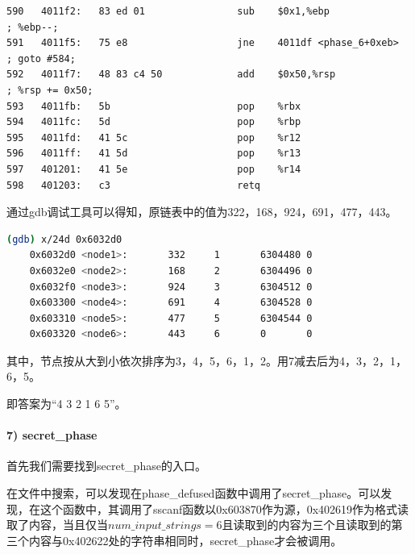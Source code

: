 \documentclass{article}
\begin{document}
\begin{lstlisting}[title = phase\_6对应的反汇编代码及注释, xleftmargin = 2em,xrightmargin = 2em, aboveskip = 1em, numbers = none, basicstyle=\footnotesize\ttfamily]
590   4011f2:   83 ed 01                sub    $0x1,%ebp                    ; %ebp--;
591   4011f5:   75 e8                   jne    4011df <phase_6+0xeb>        ; goto #584;
592   4011f7:   48 83 c4 50             add    $0x50,%rsp                   ; %rsp += 0x50;
593   4011fb:   5b                      pop    %rbx
594   4011fc:   5d                      pop    %rbp
595   4011fd:   41 5c                   pop    %r12
596   4011ff:   41 5d                   pop    %r13
597   401201:   41 5e                   pop    %r14
598   401203:   c3                      retq
  \end{lstlisting}

通过gdb调试工具可以得知，原链表中的值为322，168，924，691，477，443。
\begin{lstlisting}[language=bash]
    (gdb) x/24d 0x6032d0
    0x6032d0 <node1>:       332     1       6304480 0
    0x6032e0 <node2>:       168     2       6304496 0
    0x6032f0 <node3>:       924     3       6304512 0
    0x603300 <node4>:       691     4       6304528 0
    0x603310 <node5>:       477     5       6304544 0
    0x603320 <node6>:       443     6       0       0
  \end{lstlisting}

其中，节点按从大到小依次排序为3，4，5，6，1，2。用7减去后为4，3，2，1，6，5。

即答案为“4 3 2 1 6 5”。

\paragraph{7) secret\_phase}首先我们需要找到secret\_phase的入口。

在文件中搜索，可以发现在phase\_defused函数中调用了secret\_phase。可以发现，在这个函数中，其调用了sscanf函数以0x603870作为源，0x402619作为格式读取了内容，当且仅当$num\_input\_strings = 6$且读取到的内容为三个且读取到的第三个内容与0x402622处的字符串相同时，secret\_phase才会被调用。
\end{document}
